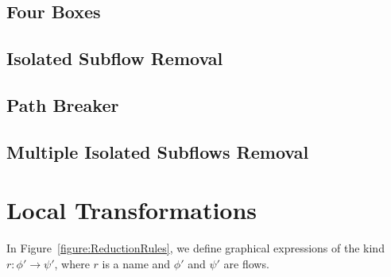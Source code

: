 \subsection{Four Boxes}\label{subsection:FourBoxes}



\subsection{Isolated Subflow Removal}\label{subsection:IsolatedSubflowRemoval}



\subsection{Path Breaker}\label{subsection:PathBreaker}



\subsection{Multiple Isolated Subflows Removal}\label{subsection:MultipleIsolatedSubflowsRemoval}



\section{Local Transformations}

\begin{definition}\label{definition:FlowGraphicalExpressions}
In Figure~\vref{figure:ReductionRules}, we define graphical expressions of the kind $r\colon\phi'\to\psi'$, where $r$ is a name and $\phi'$ and $\psi'$ are flows.
\end{definition}


